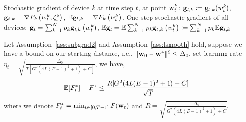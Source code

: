 
Stochastic gradient of device $k$ at time step $t$, at point ${\mathbf{w}}_t^k$: 
	${\mathbf{g}}_{t,k} \coloneqq {\mathbf{g}}_{t,k}(w_t^k)$,
	$ {\mathbf{g}}_{t, k} = {\nabla} F_{k}\left(w_{t}^{k}, \xi_{t}^{k}\right) $,
	$\mathbb{E} {\mathbf{g}}_{t, k} = {\nabla} F_{k}\left(w_{t}^{k}\right)$.
One-step stochastic gradient of all devices:
${\mathbf{g}}_{t}=\sum_{k=1}^{N} p_{k} {\mathbf{g}}_{t, k}\left(w_{t}^{k}\right) $, $\mathbb{E} {\mathbf{g}}_{t}= \mathbb{E} \sum_{k=1}^{N} p_{k} {\mathbf{g}}_{t, k}\left(w_{t}^{k}\right) \coloneqq \sum_{k=1}^{N} p_{k} \mathbb{E} {\mathbf{g}}_{t, k}$

\begin{theorem}
Let Assumption~\ref{ass:subgrad2} and Assumption~\ref{ass:lsmooth} hold, suppose we have a bound 
on our starting distance, i.e., $\|{\mathbf{w}}_{0} - {\mathbf{w}}^*\|^2 \leq \Delta_0$, set learning rate $\eta_t = \sqrt{ \frac{\Delta_0}{ T [G^2( 4L(E-1)^2 + 1) + C] }}$, we have,
$$\mathbb{E}[ F_t^*] - F^*  \leq \frac{R [G^2( 4L(E-1)^2 + 1) + C] }{\sqrt{T}}$$
where we denote $F^*_t = \min_{t \in [0, T-1]} F({\overline{\mathbf{w}}}_t)$ and $R = \sqrt{ \frac{\Delta_0}{ G^2( 4L(E-1)^2 + 1) + C }}$.
\label{th:sgdcvxsmth}
\end{theorem}

